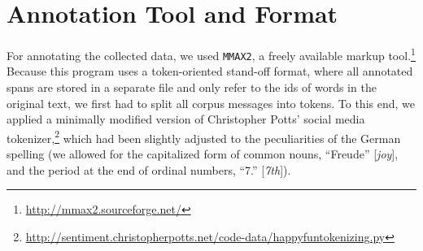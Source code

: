 \section{Annotation Tool and Format}\label{subsec:snt:tformat}

For annotating the collected data, we used \texttt{MMAX2}, a freely
available markup tool.\footnote{\url{http://mmax2.sourceforge.net/}}
Because this program uses a token-oriented stand-off format, where all
annotated spans are stored in a separate file and only refer to the
ids of words in the original text, we first had to split all corpus
messages into tokens.  To this end, we applied a minimally modified
version of Christopher Potts' social media
tokenizer,\footnote{\url{http://sentiment.christopherpotts.net/code-data/happyfuntokenizing.py}}
which had been slightly adjusted to the peculiarities of the German
spelling (we allowed for the capitalized form of common nouns, \eg{}
``Freude'' [\emph{joy}], and the period at the end of ordinal numbers,
\eg{} ``7.''  [\emph{7th}]).


